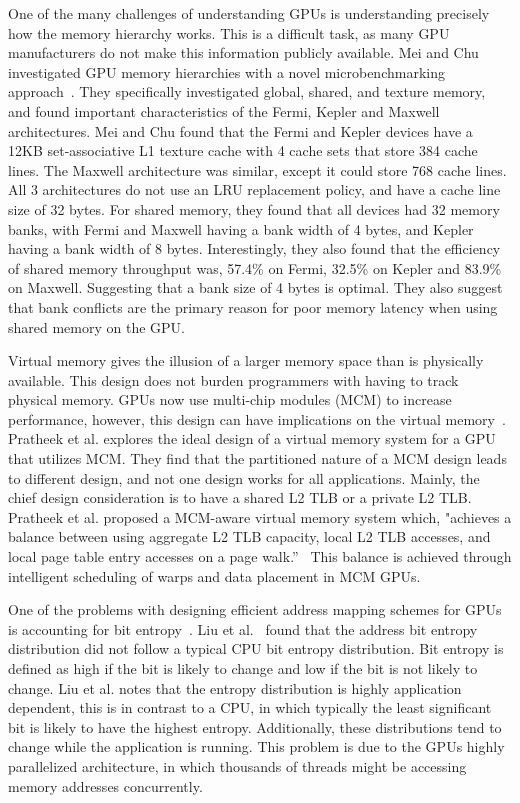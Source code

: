 \documentclass[conference]{IEEEtran}
\begin{document}
One of the many challenges of understanding GPUs is understanding precisely how the memory hierarchy works.
This is a difficult task, as many GPU manufacturers do not make this information publicly available.
Mei and Chu investigated GPU memory hierarchies with a novel microbenchmarking approach~\cite{Mei2015}.
They specifically investigated global, shared, and texture memory, and found important characteristics of the Fermi, Kepler and Maxwell architectures.
Mei and Chu found that the Fermi and Kepler devices have a 12KB set-associative L1 texture cache with 4 cache sets that store 384 cache lines.
The Maxwell architecture was similar, except it could store 768 cache lines.
All 3 architectures do not use an LRU replacement policy, and have a cache line size of 32 bytes.
For shared memory, they found that all devices had 32 memory banks, with Fermi and Maxwell having a bank width of 4 bytes, and Kepler having a bank width of 8 bytes.
Interestingly, they also found that the efficiency of shared memory throughput was, 57.4\% on Fermi, 32.5\% on Kepler and 83.9\% on Maxwell.
Suggesting that a bank size of 4 bytes is optimal.
They also suggest that bank conflicts are the primary reason for poor memory latency when using shared memory on the GPU.

Virtual memory gives the illusion of a larger memory space than is physically available.
This design does not burden programmers with having to track physical memory.
GPUs now use multi-chip modules (MCM) to increase performance, however, this design can have implications on the virtual memory~\cite{Pratheek2023}.
Pratheek et al. explores the ideal design of a virtual memory system for a GPU that utilizes MCM.
They find that the partitioned nature of a MCM design leads to different design, and not one design works for all applications.
Mainly, the chief design consideration is to have a shared L2 TLB or a private L2 TLB.
Pratheek et al. proposed a MCM-aware virtual memory system which, "achieves a balance between using aggregate L2 TLB capacity, local L2 TLB accesses, and local page table entry accesses on a page walk.''~\cite{Pratheek2023}
This balance is achieved through intelligent scheduling of warps and data placement in MCM GPUs.

One of the problems with designing efficient address mapping schemes for GPUs is accounting for bit entropy~\cite{Liu2018}.
Liu et al.~\cite{Liu2018} found that the address bit entropy distribution did not follow a typical CPU bit entropy distribution.
Bit entropy is defined as high if the bit is likely to change and low if the bit is not likely to change.
Liu et al. notes that the entropy distribution is highly application dependent, this is in contrast to a CPU, in which typically the least significant bit is likely to have the highest entropy.
Additionally, these distributions tend to change while the application is running.
This problem is due to the GPUs highly parallelized architecture, in which thousands of threads might be accessing memory addresses concurrently.
\end{document}
